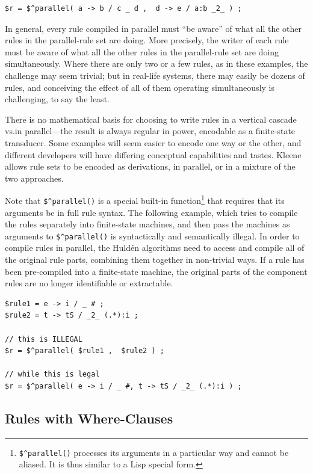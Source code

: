 \begin{Verbatim}
$r = $^parallel( a -> b / c _ d ,  d -> e / a:b _2_ ) ;
\end{Verbatim}

In general, every rule compiled in parallel must ``be aware'' of what all the other rules
in the parallel-rule set are doing.  More precisely, the writer of each rule must be aware of
what all the other rules in the parallel-rule set are doing
simultaneously.  Where there are only two or a few rules,
as in these examples, the challenge may seem trivial; but in real-life systems, there may
easily be
dozens of rules, and conceiving the effect of all of them operating simultaneously is
challenging, to say the least.

There is no mathematical basis for choosing to write rules in a vertical cascade vs.\@ in
parallel---the result is always regular in power, encodable as a finite-state transducer.
Some examples will seem easier to encode one way or the other, and different developers
will have differing conceptual capabilities and tastes.  Kleene allows rule sets to be
encoded as derivations, in parallel, or in a mixture of the two approaches.

Note that \verb!$^parallel()! is a special built-in
function\footnote{\verb!$^parallel()! processes its arguments in
a particular way and cannot be aliased.  It is thus similar to a Lisp
special form.}  that requires that its arguments be in full rule syntax.  The following example, which
tries to compile the rules separately into finite-state machines, and then pass
the machines as arguments to \verb!$^parallel()! is syntactically and
semantically
illegal.  In order to compile rules in parallel, the Huld\'en algorithms need to access
and compile all of the original rule parts,
combining them together in non-trivial ways.  If a rule has been pre-compiled into a finite-state machine, the original parts of
the component rules are no longer identifiable or extractable.

\begin{Verbatim}
$rule1 = e -> i / _ # ;
$rule2 = t -> tS / _2_ (.*):i ;

// this is ILLEGAL
$r = $^parallel( $rule1 ,  $rule2 ) ;

// while this is legal
$r = $^parallel( e -> i / _ #, t -> tS / _2_ (.*):i ) ;
\end{Verbatim}

\subsection{Rules with Where-Clauses}

